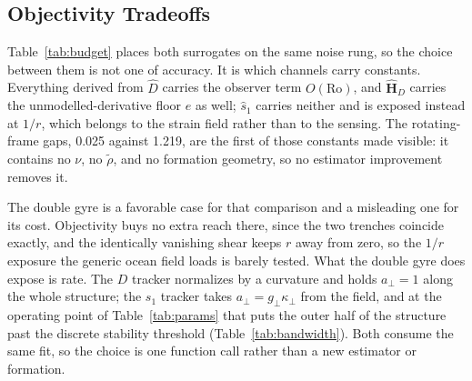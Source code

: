 %

\subsection{Objectivity Tradeoffs}
\label{sec:objectivity_tradeoff}

Table~\ref{tab:budget} places both surrogates on the same noise rung, so
the choice between them is not one of accuracy. It is which channels
carry constants. Everything derived from $\hat{D}$ carries the observer
term $O(\mathrm{Ro})$, and $\hat{\mathbf{H}}_D$ carries the
unmodelled-derivative floor $e$ as well; $\hat{s}_1$ carries neither and
is exposed instead at $1/r$, which belongs to the strain field rather
than to the sensing. The rotating-frame gaps, 0.025 against 1.219, are
the first of those constants made visible: it contains no $\nu$, no
$\tilde{\rho}$, and no formation geometry, so no estimator improvement
removes it.

The double gyre is a favorable case for that comparison and a
misleading one for its cost. Objectivity buys no extra reach there,
since the two trenches coincide exactly, and the identically vanishing
shear keeps $r$ away from zero, so the $1/r$ exposure the generic ocean
field loads is barely tested. What the double gyre does expose is
rate. The $D$ tracker
normalizes by a curvature and holds $a_\perp = 1$ along the whole
structure; the $s_1$ tracker takes $a_\perp = g_\perp\kappa_\perp$ from
the field, and at the operating point of Table~\ref{tab:params} that
puts the outer half of the structure past the discrete stability
threshold (Table~\ref{tab:bandwidth}). Both consume the same fit, so the
choice is one function call rather than a new estimator or formation.

